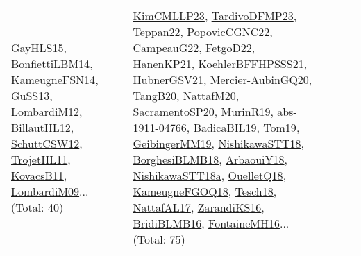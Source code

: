 {\begin{longtable}{lp{3cm}>{\raggedright}p{6cm}>{\raggedright}p{6cm}p{8cm}}
\href{papers/GayHLS15.pdf}{GayHLS15}\cite{GayHLS15}, \href{articles/BonfiettiLBM14.pdf}{BonfiettiLBM14}\cite{BonfiettiLBM14}, \href{articles/KameugneFSN14.pdf}{KameugneFSN14}\cite{KameugneFSN14}, \href{papers/GuSS13.pdf}{GuSS13}\cite{GuSS13}, \href{articles/LombardiM12.pdf}{LombardiM12}\cite{LombardiM12}, \href{papers/BillautHL12.pdf}{BillautHL12}\cite{BillautHL12}, \href{papers/SchuttCSW12.pdf}{SchuttCSW12}\cite{SchuttCSW12}, \href{articles/TrojetHL11.pdf}{TrojetHL11}\cite{TrojetHL11}, \href{articles/KovacsB11.pdf}{KovacsB11}\cite{KovacsB11}, \href{papers/LombardiM09.pdf}{LombardiM09}\cite{LombardiM09}... (Total: 40) & \href{papers/KimCMLLP23.pdf}{KimCMLLP23}\cite{KimCMLLP23}, \href{papers/TardivoDFMP23.pdf}{TardivoDFMP23}\cite{TardivoDFMP23}, \href{papers/Teppan22.pdf}{Teppan22}\cite{Teppan22}, \href{papers/PopovicCGNC22.pdf}{PopovicCGNC22}\cite{PopovicCGNC22}, \href{articles/CampeauG22.pdf}{CampeauG22}\cite{CampeauG22}, \href{articles/FetgoD22.pdf}{FetgoD22}\cite{FetgoD22}, \href{papers/HanenKP21.pdf}{HanenKP21}\cite{HanenKP21}, \href{articles/KoehlerBFFHPSSS21.pdf}{KoehlerBFFHPSSS21}\cite{KoehlerBFFHPSSS21}, \href{articles/HubnerGSV21.pdf}{HubnerGSV21}\cite{HubnerGSV21}, \href{papers/Mercier-AubinGQ20.pdf}{Mercier-AubinGQ20}\cite{Mercier-AubinGQ20}, \href{papers/TangB20.pdf}{TangB20}\cite{TangB20}, \href{papers/NattafM20.pdf}{NattafM20}\cite{NattafM20}, \href{articles/SacramentoSP20.pdf}{SacramentoSP20}\cite{SacramentoSP20}, \href{papers/MurinR19.pdf}{MurinR19}\cite{MurinR19}, \href{articles/abs-1911-04766.pdf}{abs-1911-04766}\cite{abs-1911-04766}, \href{papers/BadicaBIL19.pdf}{BadicaBIL19}\cite{BadicaBIL19}, \href{papers/Tom19.pdf}{Tom19}\cite{Tom19}, \href{papers/GeibingerMM19.pdf}{GeibingerMM19}\cite{GeibingerMM19}, \href{papers/NishikawaSTT18.pdf}{NishikawaSTT18}\cite{NishikawaSTT18}, \href{articles/BorghesiBLMB18.pdf}{BorghesiBLMB18}\cite{BorghesiBLMB18}, \href{papers/ArbaouiY18.pdf}{ArbaouiY18}\cite{ArbaouiY18}, \href{papers/NishikawaSTT18a.pdf}{NishikawaSTT18a}\cite{NishikawaSTT18a}, \href{papers/OuelletQ18.pdf}{OuelletQ18}\cite{OuelletQ18}, \href{papers/KameugneFGOQ18.pdf}{KameugneFGOQ18}\cite{KameugneFGOQ18}, \href{papers/Tesch18.pdf}{Tesch18}\cite{Tesch18}, \href{articles/NattafAL17.pdf}{NattafAL17}\cite{NattafAL17}, \href{articles/ZarandiKS16.pdf}{ZarandiKS16}\cite{ZarandiKS16}, \href{articles/BridiBLMB16.pdf}{BridiBLMB16}\cite{BridiBLMB16}, \href{papers/FontaineMH16.pdf}{FontaineMH16}\cite{FontaineMH16}... (Total: 75)\\

\end{longtable}}
